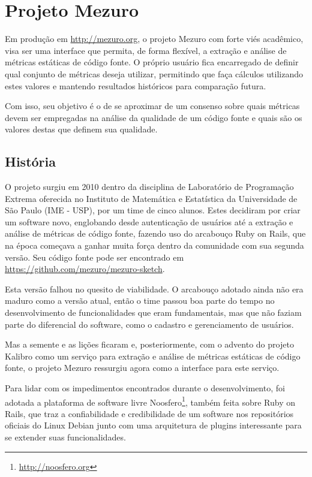 \documentclass[12pt]{article}
\begin{document}
\section{Projeto Mezuro} \label{sec:projeto-mezuro}
Em produção em \url{http://mezuro.org}, o projeto Mezuro com forte viés acadêmico, visa ser uma interface que permita, de forma flexível, a extração e análise de métricas estáticas de código fonte. O próprio usuário fica encarregado de definir qual conjunto de métricas deseja utilizar, permitindo que faça cálculos utilizando estes valores e mantendo resultados históricos para comparação futura.

Com isso, seu objetivo é o de se aproximar de um consenso sobre quais métricas devem ser empregadas na análise da qualidade de um código fonte e quais são os valores destas que definem sua qualidade.

  \subsection{História} \label{subsec:historia}
  O projeto surgiu em 2010 dentro da disciplina de Laboratório de Programação Extrema oferecida no Instituto de Matemática e Estatística da Universidade de São Paulo (IME - USP), por um time de cinco alunos. Estes decidiram por criar um software novo, englobando desde autenticação de usuários até a extração e análise de métricas de código fonte, fazendo uso do arcabouço Ruby on Rails, que na época começava a ganhar muita força dentro da comunidade com sua segunda versão. Seu código fonte pode ser encontrado em \url{https://github.com/mezuro/mezuro-sketch}.

  Esta versão falhou no quesito de viabilidade. O arcabouço adotado ainda não era maduro como a versão atual, então o time passou boa parte do tempo no desenvolvimento de funcionalidades que eram fundamentais, mas que não faziam parte do diferencial do software, como o cadastro e gerenciamento de usuários.

  Mas a semente e as lições ficaram e, posteriormente, com o advento do projeto Kalibro \cite{of13} como um serviço para extração e análise de métricas estáticas de código fonte, o projeto Mezuro ressurgiu agora como a interface para este serviço.

  Para lidar com os impedimentos encontrados durante o desenvolvimento, foi adotada a plataforma de software livre Noosfero\footnote{\url{http://noosfero.org}}, também feita sobre Ruby on Rails, que traz a confiabilidade e credibilidade de um software nos repositórios oficiais do Linux Debian junto com uma arquitetura de plugins interessante para se extender suas funcionalidades.
\end{document}
